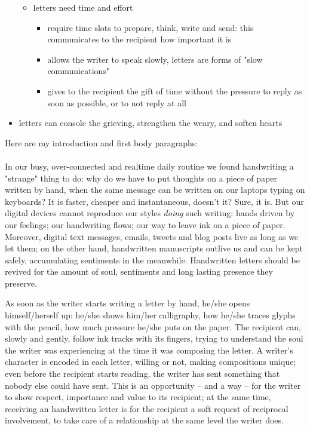 \begin{itemize}
\begin{itemize}
        \item letters need time and effort

            \begin{itemize}
                \item require time slots to prepare, think, write and send: this
                        communicates to the recipient how important it is
                \item allows the writer to speak slowly, letters are forms of "slow communications"
                \item gives to the recipient the gift of time without the pressure to reply
                        as soon as possible, or to not reply at all
            \end{itemize}

    \end{itemize}

    \item letters can console the grieving, strengthen the weary, and soften hearts
\end{itemize}

Here are my introduction and first body paragraphs:
\\\\
In our busy, over-connected and realtime daily routine we found handwriting a "strange"
thing to do: why do we have to put thoughts on a piece of paper written by hand, when the same
message can be written on our laptops typing on keyboards? It is faster,
cheaper and instantaneous, doesn't it? Sure, it is. But our digital devices cannot
reproduce our styles \emph{doing} such writing: hands driven by our feelings; our handwriting
flows; our way to leave ink on a piece of paper. Moreover, digital text messages, emails, tweets and
blog posts live as long as we let them; on the other hand, handwritten manuscripts 
outlive us and can be kept safely, accumulating sentiments in the meanwhile.
Handwritten letters should be revived for the amount of soul, sentiments and 
long lasting presence they preserve.

As soon as the writer starts writing a letter by hand, he/she opens himself/herself up: he/she shows
him/her calligraphy, how he/she traces glyphs with the pencil, how much pressure he/she puts on the paper.
The recipient can, slowly and gently, follow ink tracks with its fingers, trying 
to understand the soul the writer was experiencing at the time it was composing the letter. 
A writer's character is encoded
in each letter, willing or not, making compositions unique; even before the recipient
starts reading, the writer has sent something that nobody else could have sent. 
This is an opportunity -- and a way -- for the writer to show respect, 
importance and value to its recipient;
at the same time, receiving an handwritten letter is for the recipient a soft request of 
reciprocal involvement, to take care of a relationship at the same level the writer does.
